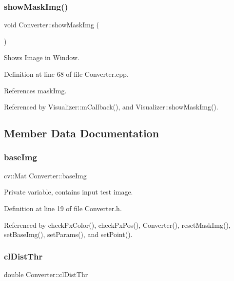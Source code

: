 \subsubsection{\texorpdfstring{showMaskImg()}{showMaskImg()}}
{\footnotesize\ttfamily void Converter\+::show\+Mask\+Img (\begin{DoxyParamCaption}{ }\end{DoxyParamCaption})}



Shows Image in Window. 



Definition at line 68 of file Converter.\+cpp.



References mask\+Img.



Referenced by Visualizer\+::m\+Callback(), and Visualizer\+::show\+Mask\+Img().



\subsection{Member Data Documentation}
\mbox{\label{class_converter_a18f46c46afdfdbca3164cfe21b7f396d}} 
\subsubsection{\texorpdfstring{baseImg}{baseImg}}
{\footnotesize\ttfamily cv\+::\+Mat Converter\+::base\+Img\hspace{0.3cm}{\ttfamily [private]}}



Private variable, contains input test image. 



Definition at line 19 of file Converter.\+h.



Referenced by check\+Px\+Color(), check\+Px\+Pos(), Converter(), reset\+Mask\+Img(), set\+Base\+Img(), set\+Params(), and set\+Point().

\mbox{\label{class_converter_a1e0bff93aec2544cdecfb00db1006d0d}} 
\subsubsection{\texorpdfstring{clDistThr}{clDistThr}}
{\footnotesize\ttfamily double Converter\+::cl\+Dist\+Thr\hspace{0.3cm}{\ttfamily [private]}}



